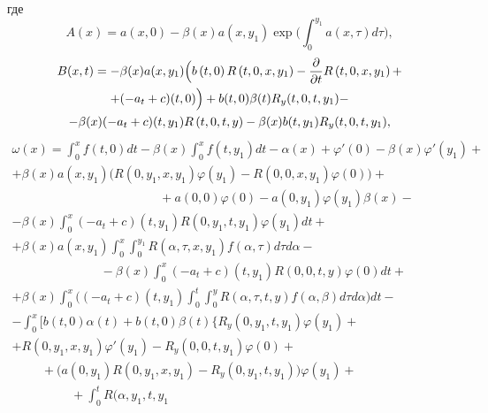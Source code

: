 \noindent
где 
$$A(x) = a(x, 0) - \beta (x)a(x,y_1 )\exp \biggl(\int _0^{y_1 } a(x,\tau
)d\tau \biggr),$$
\begin{multline}
 B(x,t) = - \beta (x)a(x,y_1 )\Bigl( b\left( {t, 0} \right)R\left(
{t, 0,x,y_1 } \right) - \frac{\partial }{\partial t}R\left( {t, 0,x,y_1 }
\right) + \\ + ( - a_t + c)(t, 0) \Bigr) +  b(t, 0)\beta (t)R_y (t, 0,t,y_1 ) -
\\
-
 \beta (x)( - a_t + c)(t,y_1 )R\left( {t, 0,t,y} \right) - \beta (x)b(t,y_1 )R_y (t, 0,t,y_1 ), 
 \end{multline}
\begin{multline}
\omega (x) = \int _0^x f(t, 0)dt - \beta (x)\int _0^x f(t,y_1 )dt 
- \alpha (x) + {\varphi }'(0) - \beta (x){\varphi }'(y_1 ) + 
\\ +
 \beta (x)a(x,y_1 ) 
 \bigl(R\left( {0,y_1 ,x,y_1 } \right)\varphi \left( {y_1 }
\right) - R\left( {0, 0,x,y_1 } \right)\varphi \left( 0 \right)\bigr) +
\\
\hspace{5cm}
+
a(0, 0)\varphi (0) - a(0,y_1 )\varphi (y_1 )\beta (x) - \\
 - \beta (x)\int _0^x ( - a_t + c)(t,y_1 )R\left( {0,y_1 ,t,y_1 }
\right)\varphi \left( {y_1 } \right)dt + \hspace{4cm}
\\
 + \beta (x)a(x,y_1 )\int _0^x \int _0^{y_1 } R\left( {\alpha
,\tau ,x,y_1 } \right)f\left( {\alpha ,\tau } \right)d\tau d\alpha - 
\\ %
\hspace{3cm}
-
\beta
(x)\int _0^x ( - a_t + c)(t,y_1 )R\left( {0, 0,t,y} \right)\varphi
\left( 0 \right)dt +
\\
 + \beta (x)\int _0^x \biggl( ( - a_t + c)(t,y_1 )\int _0^t
\int _0^y R\left( {\alpha ,\tau ,t,y} \right)f\left( {\alpha ,\beta }
\right)d\tau d\alpha \biggr) dt - 
\\
 - \int _0^x \biggl[
 b(t, 0)\alpha (t) + b(t, 0)\beta (t)\biggl\{R_y (0,y_1 ,t,y_1
)\varphi (y_1 ) + \hspace{2cm}
\\
 + R(0,y_1 ,x,y_1 ){\varphi }'(y_1 ) - R_y (0, 0,t,y_1 )\varphi (0) + \hspace{1cm}
 \\
\hspace{1cm} 
 +
 \bigl(a(0,y_1 )R(0,y_1 ,x,y_1 ) -  R_y (0,y_1 ,t,y_1 )\bigr)\varphi (y_1 )+ 
 \\ 
 \hspace{2cm} 
  + \int _0^t R(\alpha ,y_1 ,t,y_1

\end{multline}
